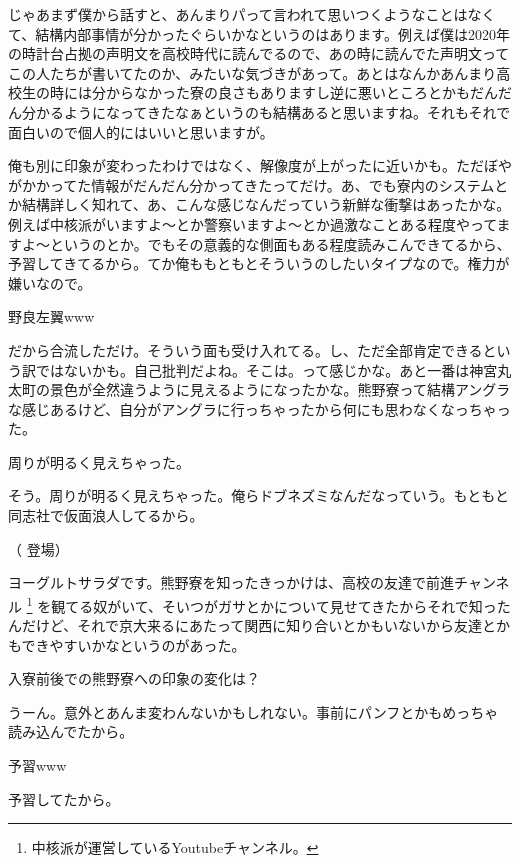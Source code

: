 \begin{multicols}{2}
  
じゃあまず僕から話すと、あんまりパって言われて思いつくようなことはなくて、結構内部事情が分かったぐらいかなというのはあります。例えば僕は2020年の時計台占拠の声明文を高校時代に読んでるので、あの時に読んでた声明文ってこの人たちが書いてたのか、みたいな気づきがあって。あとはなんかあんまり高校生の時には分からなかった寮の良さもありますし逆に悪いところとかもだんだん分かるようになってきたなぁというのも結構あると思いますね。それもそれで面白いので個人的にはいいと思いますが。

  
俺も別に印象が変わったわけではなく、解像度が上がったに近いかも。ただぼやがかかってた情報がだんだん分かってきたってだけ。あ、でも寮内のシステムとか結構詳しく知れて、あ、こんな感じなんだっていう新鮮な衝撃はあったかな。例えば中核派がいますよ～とか警察いますよ～とか過激なことある程度やってますよ～というのとか。でもその意義的な側面もある程度読みこんできてるから、予習してきてるから。てか俺ももともとそういうのしたいタイプなので。権力が嫌いなので。

  
野良左翼www

  
だから合流しただけ。そういう面も受け入れてる。し、ただ全部肯定できるという訳ではないかも。自己批判だよね。そこは。って感じかな。あと一番は神宮丸太町の景色が全然違うように見えるようになったかな。熊野寮って結構アングラな感じあるけど、自分がアングラに行っちゃったから何にも思わなくなっちゃった。

  
周りが明るく見えちゃった。

  
そう。周りが明るく見えちゃった。俺らドブネズミなんだなっていう。もともと同志社で仮面浪人してるから。

  
\centerline{（\hspace{4pt} 登場\hspace{4pt}）}
ヨーグルトサラダです。熊野寮を知ったきっかけは、高校の友達で前進チャンネル \footnote{中核派が運営しているYoutubeチャンネル。} を観てる奴がいて、そいつがガサとかについて見せてきたからそれで知ったんだけど、それで京大来るにあたって関西に知り合いとかもいないから友達とかもできやすいかなというのがあった。

  
入寮前後での熊野寮への印象の変化は？

  
うーん。意外とあんま変わんないかもしれない。事前にパンフとかもめっちゃ読み込んでたから。

  
予習www

  
予習してたから。


\end{multicols}
